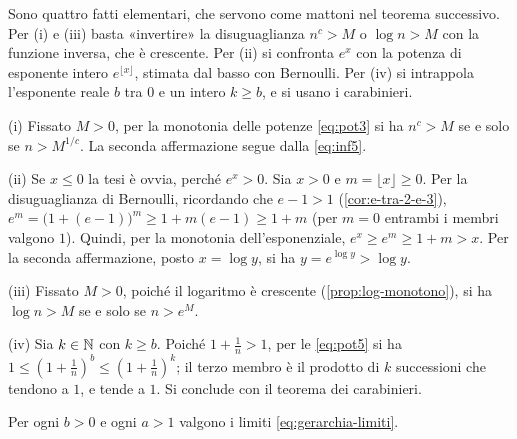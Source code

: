 \begin{schema}
\end{schema}

\begin{strategia}
Sono quattro fatti elementari, che servono come mattoni nel teorema successivo. Per (i)
e (iii) basta «invertire» la disuguaglianza $n^{c}>M$ o $\log n>M$ con la funzione
inversa, che è crescente. Per (ii) si confronta $e^{x}$ con la potenza di esponente
intero $e^{\lfloor x\rfloor}$, stimata dal basso con Bernoulli. Per (iv) si intrappola
l'esponente reale $b$ tra $0$ e un intero $k\ge b$, e si usano i carabinieri.
\end{strategia}

\begin{dimostrazione}
(i) Fissato $M>0$, per la monotonia delle potenze \eqref{eq:pot3} si ha $n^{c}>M$ se e
solo se $n>M^{1/c}$. La seconda affermazione segue dalla \eqref{eq:inf5}.

(ii) Se $x\le0$ la tesi è ovvia, perché $e^{x}>0$. Sia $x>0$ e $m=\lfloor x\rfloor\ge0$.
Per la disuguaglianza di Bernoulli, ricordando che $e-1>1$ (\cref{cor:e-tra-2-e-3}),
$e^{m}=\bigl(1+(e-1)\bigr)^{m}\ge1+m(e-1)\ge1+m$ (per $m=0$ entrambi i membri valgono
$1$). Quindi, per la monotonia dell'esponenziale, $e^{x}\ge e^{m}\ge1+m>x$. Per la
seconda affermazione, posto $x=\log y$, si ha $y=e^{\log y}>\log y$.

(iii) Fissato $M>0$, poiché il logaritmo è crescente (\cref{prop:log-monotono}), si ha
$\log n>M$ se e solo se $n>e^{M}$.

(iv) Sia $k\in\mathbb{N}$ con $k\ge b$. Poiché $1+\frac1n>1$, per le \eqref{eq:pot5} si ha
$1\le(1+\frac1n)^{b}\le(1+\frac1n)^{k}$; il terzo membro è il prodotto di $k$ successioni
che tendono a $1$, e tende a $1$. Si conclude con il teorema dei carabinieri.
\end{dimostrazione}

\begin{teorema}\label{teo:gerarchia}
Per ogni $b>0$ e ogni $a>1$ valgono i limiti \eqref{eq:gerarchia-limiti}.
\end{teorema}

\begin{schema}
\end{schema}

